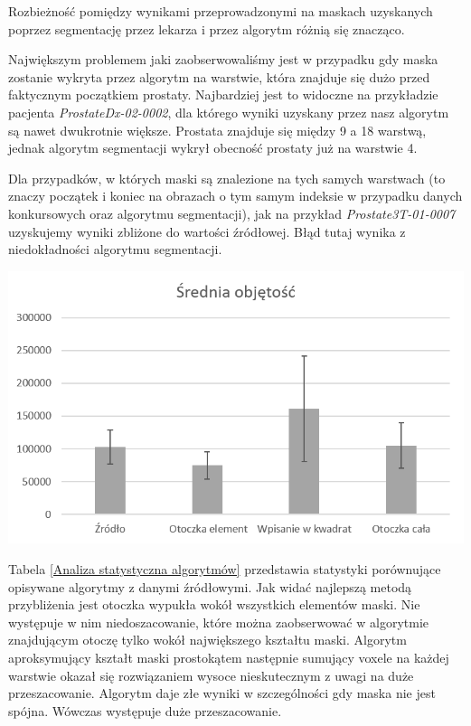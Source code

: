 \documentclass[a4paper,11pt,twoside]{report}
\theoremstyle{definition}
\begin{document}
Rozbieżność pomiędzy wynikami przeprowadzonymi na maskach uzyskanych poprzez segmentację przez lekarza i przez algorytm różnią się znacząco. 
\par
Największym problemem jaki zaobserwowaliśmy jest w przypadku gdy maska zostanie wykryta przez algorytm na warstwie, która znajduje się dużo przed faktycznym początkiem prostaty. Najbardziej jest to widoczne na przykładzie pacjenta \textit{ProstateDx-02-0002}, dla którego wyniki uzyskany przez nasz algorytm są nawet dwukrotnie większe. Prostata znajduje się między 9 a 18 warstwą, jednak algorytm segmentacji wykrył obecność prostaty już na warstwie 4. 
\par 
Dla przypadków, w których maski są znalezione na tych samych warstwach (to znaczy początek i koniec na obrazach o tym samym indeksie w przypadku danych konkursowych oraz algorytmu segmentacji), jak na przykład \textit{Prostate3T-01-0007} uzyskujemy wyniki zbliżone do wartości źródłowej. Błąd tutaj wynika z niedokładności algorytmu segmentacji.
 

\begin{minipage}{\linewidth}
	\centering
	\includegraphics[width=\textwidth]{WynikiObjetosc.png}
\end{minipage}

Tabela \ref{Analiza statystyczna algorytmów} przedstawia statystyki porównujące opisywane algorytmy z danymi źródłowymi. Jak widać najlepszą metodą przybliżenia jest otoczka wypukła wokół wszystkich elementów maski. Nie występuje w nim niedoszacowanie, które można zaobserwować w algorytmie znajdującym otoczę tylko wokół największego kształtu maski. Algorytm aproksymujący kształt maski prostokątem następnie sumujący voxele na każdej warstwie okazał się rozwiązaniem wysoce nieskutecznym z uwagi na duże przeszacowanie. Algorytm daje złe wyniki w szczególności gdy maska nie jest spójna. Wówczas występuje duże przeszacowanie.
\end{document}
